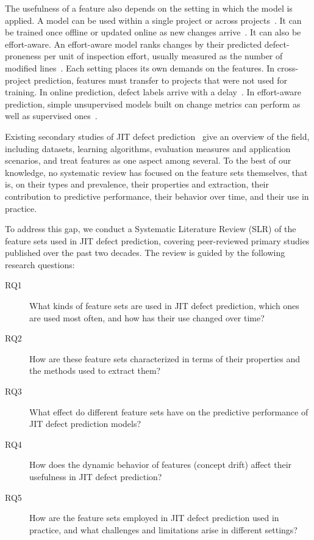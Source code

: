 \documentclass[sigconf,review]{acmart}
\begin{document}
The usefulness of a feature also depends on the setting in which the model is applied. A model can be used within a single project or across projects~\cite{kamei2016studying, dai2025}. It can be trained once offline or updated online as new changes arrive~\cite{cabral2019class, liu2025}. It can also be effort-aware. An effort-aware model ranks changes by their predicted defect-proneness per unit of inspection effort, usually measured as the number of modified lines~\cite{kamei2013large, yang2016effort}. Each setting places its own demands on the features. In cross-project prediction, features must transfer to projects that were not used for training. In online prediction, defect labels arrive with a delay~\cite{cabral2019class}. In effort-aware prediction, simple unsupervised models built on change metrics can perform as well as supervised ones~\cite{yang2016effort}.

Existing secondary studies of JIT defect prediction~\cite{zhao2023systematic, alnagi2024just} give an overview of the field, including datasets, learning algorithms, evaluation measures and application scenarios, and treat features as one aspect among several. To the best of our knowledge, no systematic review has focused on the feature sets themselves, that is, on their types and prevalence, their properties and extraction, their contribution to predictive performance, their behavior over time, and their use in practice.

To address this gap, we conduct a Systematic Literature Review (SLR) of the feature sets used in JIT defect prediction, covering peer-reviewed primary studies published over the past two decades. The review is guided by the following research questions:

\begin{description}
    \item[RQ1] What kinds of feature sets are used in JIT defect prediction, which ones are used most often, and how has their use changed over time?
    \item[RQ2] How are these feature sets characterized in terms of their properties and the methods used to extract them?
    \item[RQ3] What effect do different feature sets have on the predictive performance of JIT defect prediction models?
    \item[RQ4] How does the dynamic behavior of features (concept drift) affect their usefulness in JIT defect prediction?
    \item[RQ5] How are the feature sets employed in JIT defect prediction used in practice, and what challenges and limitations arise in different settings?
\end{description}
\end{document}
